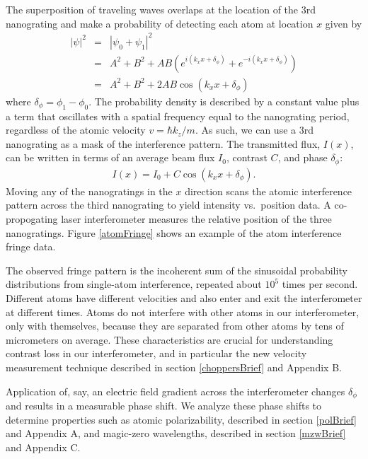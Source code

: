 The superposition of traveling waves overlaps at the location of the 3rd nanograting and make a probability of detecting each atom at location $x$ given by
\begin{eqnarray}
|\psi|^2&=&|\psi_0+\psi_1|^2\nonumber\\
&=&A^2+B^2+AB\left(e^{i(k_x x + \delta_\phi)}+e^{-i(k_x x + \delta_\phi)}\right)\nonumber\\
&=&A^2+B^2+2AB\cos(k_x x + \delta_\phi)
\end{eqnarray}
where $\delta_\phi = \phi_1-\phi_0$. The probability density is described by a constant value plus a term that oscillates with a spatial frequency equal to the nanograting period, regardless of the atomic velocity $v=\hbar k_z/m$. As such, we can use a 3rd nanograting as a mask of the interference pattern. The transmitted flux, $I(x)$, can be written in terms of an average beam flux $I_0$, contrast $C$, and phase $\delta_\phi$:
\begin{eqnarray}
I(x)=I_0+C\cos(k_x x + \delta_\phi).
\end{eqnarray}
Moving any of the nanogratings in the $x$ direction scans the atomic interference pattern across the third nanograting to yield intensity vs.~position data. A co-propogating laser interferometer measures the relative position of the three nanogratings. Figure \ref{atomFringe} shows an example of the atom interference fringe data. 


The observed fringe pattern is the incoherent sum of the sinusoidal probability distributions from single-atom interference, repeated about $10^5$ times per second. Different atoms have different velocities and also enter and exit the interferometer at different times. Atoms do not interfere with other atoms in our interferometer, only with themselves, because they are separated from other atoms by tens of micrometers on average. These characteristics are crucial for understanding contrast loss in our interferometer, and in particular the new velocity measurement technique described in section \ref{choppersBrief} and Appendix B. 


Application of, say, an electric field gradient across the interferometer changes $\delta_\phi$ and results in a measurable phase shift. We analyze these phase shifts to determine properties such as atomic polarizability, described in section \ref{polBrief} and Appendix A, and magic-zero wavelengths, described in section \ref{mzwBrief} and Appendix C.


